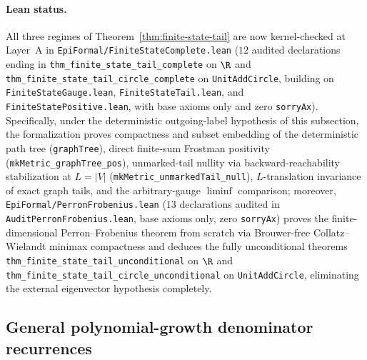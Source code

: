 \paragraph{Lean status.}
All three regimes of Theorem~\ref{thm:finite-state-tail} are now kernel-checked at Layer~A in
\texttt{EpiFormal/\allowbreak Finite\allowbreak State\allowbreak Complete.lean} ($12$ audited declarations
ending in \texttt{thm\_\allowbreak finite\_\allowbreak state\_\allowbreak tail\_\allowbreak complete} on $\R$
and \texttt{thm\_\allowbreak finite\_\allowbreak state\_\allowbreak tail\_\allowbreak circle\_\allowbreak complete}
on \texttt{UnitAddCircle}, building on \texttt{Finite\allowbreak State\allowbreak Gauge.lean},
\texttt{Finite\allowbreak State\allowbreak Tail.lean}, and
\texttt{Finite\allowbreak State\allowbreak Positive.lean}, with base axioms only and zero \texttt{sorryAx}).
Specifically, under the deterministic outgoing-label hypothesis of this subsection, the formalization proves
compactness and subset embedding of the deterministic path tree (\texttt{graphTree}),
direct finite-sum Frostman positivity (\texttt{mkMetric\_\allowbreak graphTree\_\allowbreak pos}),
unmarked-tail nullity via backward-reachability stabilization at $L=|V|$ (\texttt{mkMetric\_\allowbreak unmarkedTail\_\allowbreak null}),
$L$-translation invariance of exact graph tails, and the arbitrary-gauge $\liminf$ comparison;
moreover, \texttt{EpiFormal/\allowbreak PerronFrobenius.lean} ($13$ declarations audited in \texttt{AuditPerronFrobenius.lean}, base axioms only, zero \texttt{sorryAx}) proves the finite-dimensional Perron--Frobenius theorem from scratch via Brouwer-free Collatz--Wielandt minimax compactness and deduces the fully unconditional theorems \texttt{thm\_\allowbreak finite\_\allowbreak state\_\allowbreak tail\_\allowbreak unconditional} on $\R$ and \texttt{thm\_\allowbreak finite\_\allowbreak state\_\allowbreak tail\_\allowbreak circle\_\allowbreak unconditional} on \texttt{UnitAddCircle}, eliminating the external eigenvector hypothesis completely.

\subsection{General polynomial-growth denominator recurrences}\label{sec:poly-rec}

